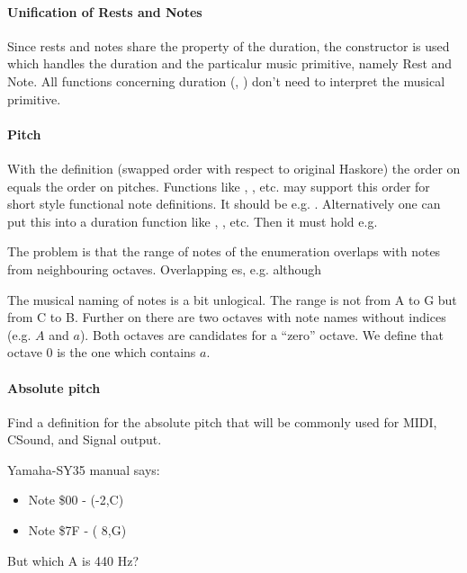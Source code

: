 \paragraph*{Unification of Rests and Notes}

Since rests and notes share the property of the duration,
the constructor  is used
which handles the duration and the particalur music primitive,
namely Rest and Note.
All functions concerning duration (, )
don't need to interpret the musical primitive.

\paragraph*{Pitch}


With the definition 
(swapped order with respect to original Haskore)
the order on  equals the order on pitches.
Functions like , ,  etc. may support this order
for short style functional note definitions.
It should be e.g. .
Alternatively one can put this into a duration function
like , , etc.
Then it must hold e.g. 

The problem is that the range of notes
of the enumeration  overlaps
with notes from neighbouring octaves.
Overlapping es,
  e.g.  although 

The musical naming of notes is a bit unlogical.
The range is not from A to G but from C to B.
Further on there are two octaves with note names without indices
(e.g. $A$ and $a$).
Both octaves are candidates for a ``zero'' octave.
We define that octave $0$ is the one which contains $a$.


\paragraph*{Absolute pitch}

Find a definition for the absolute pitch
that will be commonly used for MIDI, CSound, and Signal output.

Yamaha-SY35 manual says:
\begin{itemize}
\item Note \$00 - (-2,C)
\item Note \$7F - ( 8,G)
\end{itemize}
But which A is 440 Hz?

